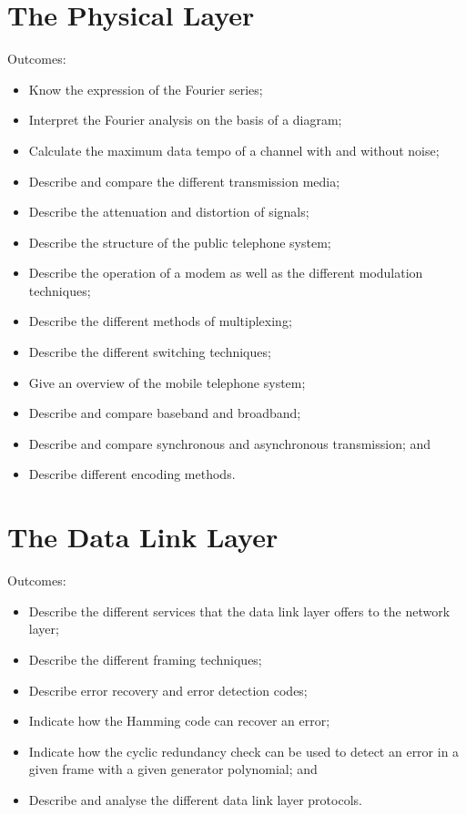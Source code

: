 \documentclass[a4paper, 12pt, titlepage]{report}
\begin{document}
\chapter{The Physical Layer}
Outcomes:
\begin{itemize}
\item Know the expression of the Fourier series;
\item Interpret the Fourier analysis on the basis of a diagram;
\item Calculate the maximum data tempo of a channel with and without noise;
\item Describe and compare the different transmission media;
\item Describe the attenuation and distortion of signals;
\item Describe the structure of the public telephone system;
\item Describe the operation of a modem as well as the different modulation techniques;
\item Describe the different methods of multiplexing;
\item Describe the different switching techniques;
\item Give an overview of the mobile telephone system;
\item Describe and compare baseband and broadband;
\item Describe and compare synchronous and asynchronous transmission; and
\item Describe different encoding methods.
\end{itemize}
\chapter{The Data Link Layer}
Outcomes:
\begin{itemize}
\item Describe the different services that the data link layer offers to the network layer;
\item Describe the different framing techniques;
\item Describe error recovery and error detection codes;
\item Indicate how the Hamming code can recover an error;
\item Indicate how the cyclic redundancy check can be used to detect an error in a given frame with a given generator polynomial; and
\item Describe and analyse the different data link layer protocols.
\end{itemize}
\end{document}
